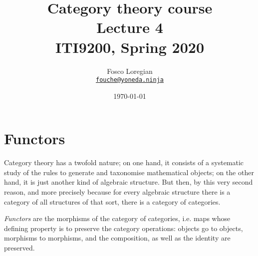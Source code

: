 \documentclass[11pt]{article}
\author{ Fosco Loregian \\
  \href{mailto:fouche@yoneda.ninja}
       {\tt fouche@yoneda.ninja}}
\date{\today}
\title{  Category theory course 
			\\ Lecture 4
			\\ ITI9200, Spring 2020
			}
\begin{document}
\maketitle
\tableofcontents
\section{Functors}
Category theory has a twofold nature; on one hand, it consists of a systematic study of the rules to generate and taxonomise mathematical objects; on the other hand, it is just another kind of algebraic structure. But then, by this very second reason, and more precisely because for every algebraic structure there is a category of all structures of that sort, there is a category of categories.

\emph{Functors} are the morphisms of the category of categories, i.e. maps whose defining property is to preserve the category operations: objects go to objects, morphisms to morphisms, and the composition, as well as the identity are preserved.
\end{document}

